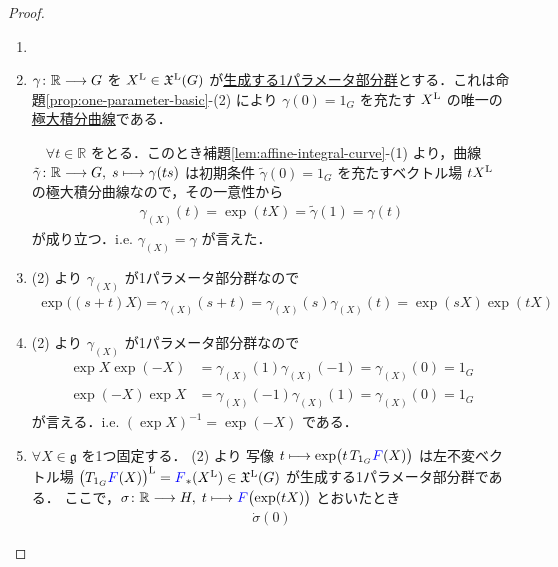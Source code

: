 \documentclass[geometry_main]{subfiles}
\begin{document}
\begin{proof}
    \begin{enumerate}
        \item ~\cite[p.519, Proposition 20.8-(1)]{Lee12}
        \item $\gamma \colon \mathbb{R} \longrightarrow G$ を $X^{\mathrm{L}} \in \mathfrak{X}^{\mathrm{L}}(G)$ が\hyperref[prop:one-parameter-basic]{生成する1パラメータ部分群}とする．これは命題\ref{prop:one-parameter-basic}-(2) により $\gamma(0) = 1_G$ を充たす $X^{\mathrm{L}}$ の唯一の\hyperref[thm:fundamental-flow]{極大積分曲線}である．
        
        　$\forall t \in \mathbb{R}$ をとる．このとき補題\ref{lem:affine-integral-curve}-(1) より，\cinfty 曲線 $\tilde{\gamma} \colon \mathbb{R} \longrightarrow G,\; s \longmapsto \gamma(ts)$ は初期条件 $\tilde{\gamma}(0) = 1_G$ を充たすベクトル場 $t X^{\mathrm{L}}$ の極大積分曲線なので，その一意性から
        \begin{align}
            \gamma_{(X)}(t) = \exp (tX) = \tilde{\gamma}(1) = \gamma(t)
        \end{align}
        が成り立つ．i.e. $\gamma_{(X)} = \gamma$ が言えた．
        \item (2) より $\gamma_{(X)}$ が1パラメータ部分群なので
        \begin{align}
            \exp \bigl( (s+t)X \bigr) = \gamma_{(X)}(s+t) = \gamma_{(X)}(s)\gamma_{(X)}(t) = \exp(sX)\exp(tX)
        \end{align}
        \item (2) より $\gamma_{(X)}$ が1パラメータ部分群なので
        \begin{align}
            \exp X \exp(-X) &= \gamma_{(X)} (1) \gamma_{(X)}(-1) = \gamma_{(X)}(0) = 1_G \\
            \exp (-X) \exp X &= \gamma_{(X)} (-1) \gamma_{(X)}(1) = \gamma_{(X)}(0) = 1_G
        \end{align}
        が言える．i.e. $(\exp X)^{-1} = \exp (-X)$ である．
        \item $\forall X \in \mathfrak{g}$ を1つ固定する．
        (2) より \cinfty 写像 $t \longmapsto \exp \bigl(t\, T_{1_G} \textcolor{blue}{F}(X)\bigr)$ は左不変ベクトル場 $\bigl(T_{1_G} \textcolor{blue}{F}(X)\bigr)^{\mathrm{L}} = \textcolor{blue}{F}_*(X^{\mathrm{L}}) \in \mathfrak{X}^{\mathrm{L}}(G)$ が生成する1パラメータ部分群である．
        ここで，$\sigma \colon \mathbb{R} \longrightarrow H,\; t \longmapsto \textcolor{blue}{F}\bigl(\exp (tX)\bigr)$ とおいたとき
        \begin{align}
            \dot{\sigma}(0)

\end{align}
\end{enumerate}
\end{proof}
\end{document}
